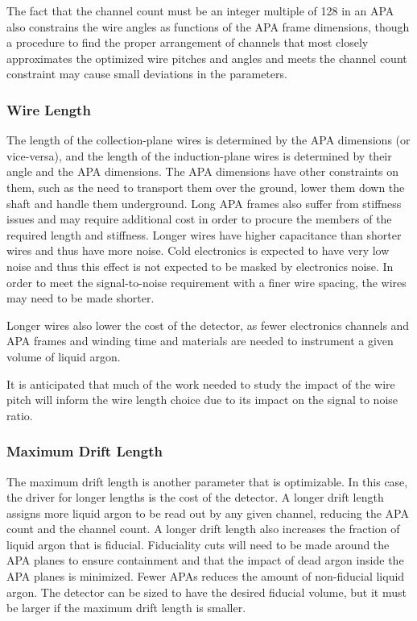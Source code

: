 The fact that the channel count must be an integer multiple of 128 in
an APA also constrains the wire angles as functions of the APA frame
dimensions, though a procedure to find the proper arrangement of
channels that most closely approximates the optimized wire pitches and
angles and meets the channel count constraint may cause small
deviations in the parameters.

\subsubsection{Wire Length}

The length of the collection-plane wires is determined by the APA
dimensions (or vice-versa), and the length of the induction-plane
wires is determined by their angle and the APA dimensions.  The APA
dimensions have other constraints on them, such as the need to
transport them over the ground, lower them down the shaft and handle
them underground.  Long APA frames also suffer from stiffness issues
and may require additional cost in order to procure the members of the
required length and stiffness.  Longer wires have higher capacitance
than shorter wires and thus have more noise.  Cold electronics is
expected to have very low noise and thus this effect is not expected
to be masked by electronics noise.  In order to meet the
signal-to-noise requirement with a finer wire spacing, the wires may
need to be made shorter.

Longer wires also lower the cost of the detector, as fewer electronics
channels and APA frames and winding time and materials are needed to
instrument a given volume of liquid argon.

It is anticipated that much of the work needed to study the impact of
the wire pitch will inform the wire length choice due to its impact on
the signal to noise ratio.

\subsubsection{Maximum Drift Length}

The maximum drift length is another parameter that is optimizable.  In
this case, the driver for longer lengths is the cost of the detector.
A longer drift length assigns more liquid argon to be read out by any
given channel, reducing the APA count and the channel count.  A longer
drift length also increases the fraction of liquid argon that is
fiducial.  Fiduciality cuts will need to be made around the APA planes
to ensure containment and that the impact of dead argon inside the APA
planes is minimized.  Fewer APAs reduces the amount of non-fiducial
liquid argon.  The detector can be sized to have the desired fiducial
volume, but it must be larger if the maximum drift length is smaller.

